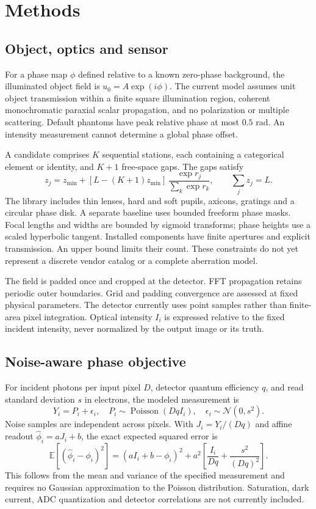 \documentclass[11pt]{article}
\begin{document}
\section{Methods}
\subsection{Object, optics and sensor}
For a phase map $\phi$ defined relative to a known zero-phase background, the
illuminated object field is $u_0=A\exp(i\phi)$. The current model assumes unit
object transmission within a finite square illumination region, coherent
monochromatic paraxial scalar propagation, and no polarization or multiple
scattering. Default phantoms have peak relative phase at most $0.5$ rad.
An intensity measurement cannot determine a global phase offset.

A candidate comprises $K$ sequential stations, each containing a categorical
element or identity, and $K+1$ free-space gaps. The gaps satisfy
\begin{equation}
 z_j=z_{\min}+[L-(K+1)z_{\min}]\,
 \frac{\exp r_j}{\sum_k\exp r_k},\qquad \sum_j z_j=L.
\end{equation}
The library includes thin lenses, hard and soft pupils, axicons, gratings and a
circular phase disk. A separate baseline uses bounded freeform phase masks.
Focal lengths and widths are bounded by sigmoid transforms; phase heights use a
scaled hyperbolic tangent. Installed components have finite apertures and explicit
transmission. An upper bound limits their count. These constraints do not yet
represent a discrete vendor catalog or a complete aberration model.

The field is padded once and cropped at the detector. FFT propagation retains
periodic outer boundaries. Grid and padding convergence are assessed at fixed
physical parameters. The detector currently uses point samples rather than
finite-area pixel integration. Optical intensity $I_i$ is expressed relative to
the fixed incident intensity, never normalized by the output image or its truth.

\subsection{Noise-aware phase objective}
For incident photons per input pixel $D$, detector quantum efficiency $q$, and
read standard deviation $s$ in electrons, the modeled measurement is
\begin{equation}
 Y_i=P_i+\epsilon_i,\quad P_i\sim\operatorname{Poisson}(DqI_i),\quad
 \epsilon_i\sim\mathcal N(0,s^2).
\end{equation}
Noise samples are independent across pixels. With $J_i=Y_i/(Dq)$ and affine
readout $\widehat\phi_i=aJ_i+b$, the exact expected squared error is
\begin{equation}\label{eq:risk}
 \mathbb E[(\widehat\phi_i-\phi_i)^2]
 =(aI_i+b-\phi_i)^2+a^2\left[\frac{I_i}{Dq}+\frac{s^2}{(Dq)^2}\right].
\end{equation}
This follows from the mean and variance of the specified measurement and requires
no Gaussian approximation to the Poisson distribution. Saturation, dark current,
ADC quantization and detector correlations are not currently included.
\end{document}

